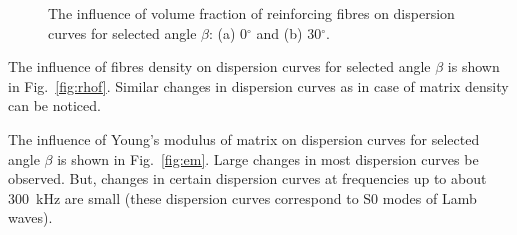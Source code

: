  
\begin{figure} [h!]
	\centering
	
	\begin{subfigure}[b]{0.49\textwidth}
		\centering
		
		
		

		\caption{}
		\label{fig:vol0}
	\end{subfigure}
	\hfill
	\begin{subfigure}[b]{0.49\textwidth}
		\centering
		
		
		
	
		\caption{}
		\label{fig:vol30}
	\end{subfigure}





















	
\caption{The influence of volume fraction of reinforcing fibres on dispersion curves 
	for selected angle \(\beta\): (a) 0\(^{\circ}\) and (b) 30\(^{\circ}\).}
 
	\label{fig:vol}
\end{figure}
\clearpage

The influence of fibres density on dispersion curves for selected angle \(\beta\) is 
shown 
in Fig.~\ref{fig:rhof}. Similar changes in dispersion curves as in case of matrix density 
can be noticed.


\begin{figure} [h!]
		\centering

		
\caption{}

		\label{fig:GAconvergence}
	\end{figure}

The influence of Young's modulus of matrix on dispersion curves for selected angle 
\(\beta\) is shown in Fig.~\ref{fig:em}. Large changes in most dispersion curves  be 
observed. But, changes in certain dispersion curves at frequencies up to about 
300~kHz are small (these dispersion curves correspond to S0 modes of Lamb waves).


